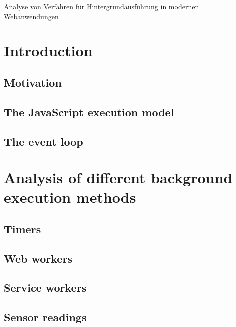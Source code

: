 \documentclass[article,type=bsc,colorback,accentcolor=tud9c]{tudthesis}
\begin{document}
    {Analyse von Verfahren für Hintergrundausführung in modernen Webanwendungen}
  \author{Yannick Reifschneider}
  \dateofexam{\today}{\today}
  \makethesistitle

  \tableofcontents

  \newpage
  
  \section{Introduction}

  \subsection{Motivation}
  
  \subsection{The JavaScript execution model}

  \subsection{The event loop}
  
  \section{Analysis of different background execution methods}

  \subsection{Timers}

  \subsection{Web workers}

  \subsection{Service workers}

  \subsection{Sensor readings}
\end{document}
